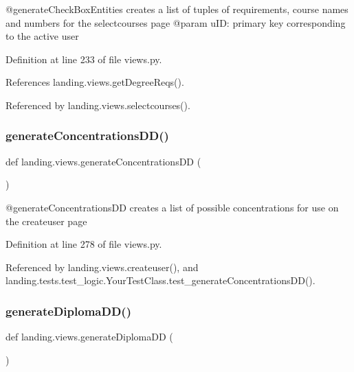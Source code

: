 \begin{DoxyVerb}@generateCheckBoxEntities creates a list of tuples of requirements, course names and numbers for the selectcourses page
@param uID: primary key corresponding to the active user
\end{DoxyVerb}
 

Definition at line 233 of file views.\+py.



References landing.\+views.\+get\+Degree\+Reqs().



Referenced by landing.\+views.\+selectcourses().

\mbox{\label{namespacelanding_1_1views_a3c3b157bf08697962286a0b17eff2d59}} 
\subsubsection{\texorpdfstring{generate\+Concentrations\+D\+D()}{generateConcentrationsDD()}}
{\footnotesize\ttfamily def landing.\+views.\+generate\+Concentrations\+DD (\begin{DoxyParamCaption}{ }\end{DoxyParamCaption})}

\begin{DoxyVerb}@generateConcentrationsDD creates a list of possible concentrations for use on the createuser page
\end{DoxyVerb}
 

Definition at line 278 of file views.\+py.



Referenced by landing.\+views.\+createuser(), and landing.\+tests.\+test\+\_\+logic.\+Your\+Test\+Class.\+test\+\_\+generate\+Concentrations\+D\+D().

\mbox{\label{namespacelanding_1_1views_a30457ad7655375a7be248dc4b36d2194}} 
\subsubsection{\texorpdfstring{generate\+Diploma\+D\+D()}{generateDiplomaDD()}}
{\footnotesize\ttfamily def landing.\+views.\+generate\+Diploma\+DD (\begin{DoxyParamCaption}{ }\end{DoxyParamCaption})}


